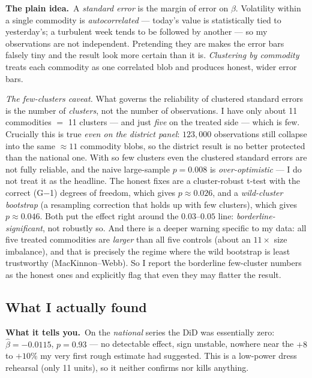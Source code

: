 \documentclass[11pt]{article}
\newcommand{\intuit}{\smallskip\noindent\textbf{The plain idea.}\ }
\newcommand{\tells}{\smallskip\noindent\textbf{What it tells you.}\ }
\begin{document}
\intuit A \emph{standard error} is the margin of error on $\beta$. Volatility within a single
commodity is \emph{autocorrelated} --- today's value is statistically tied to yesterday's; a
turbulent week tends to be followed by another --- so my observations are not independent.
Pretending they are makes the error bars falsely tiny and the result look more certain than it is.
\emph{Clustering by commodity} treats each commodity as one correlated blob and produces honest,
wider error bars.

\smallskip\noindent\emph{The few-clusters caveat.} What governs the reliability of clustered
standard errors is the number of \emph{clusters}, not the number of observations. I have only about
11 commodities $=$ 11 clusters --- and just \emph{five} on the treated side --- which is few.
Crucially this is true \emph{even on the district panel}: $123{,}000$ observations still collapse
into the same $\approx 11$ commodity blobs, so the district result is no better protected than the
national one. With so few clusters even the clustered standard errors are not fully reliable, and
the naive large-sample $p=0.008$ is \emph{over-optimistic} --- I do not treat it as the headline.
The honest fixes are a cluster-robust t-test with the correct (G$-$1) degrees of freedom, which
gives $p\approx0.026$, and a \emph{wild-cluster bootstrap} (a resampling correction that holds up
with few clusters), which gives $p\approx0.046$. Both put the effect right around the
$0.03$--$0.05$ line: \emph{borderline-significant}, not robustly so. And there is a deeper warning
specific to my data: all five treated commodities are \emph{larger} than all five controls (about
an $11\times$ size imbalance), and that is precisely the regime where the wild bootstrap is least
trustworthy (MacKinnon--Webb). So I report the borderline few-cluster numbers as the honest ones
and explicitly flag that even they may flatter the result.

\subsection{What I actually found}

\tells On the \emph{national} series the DiD was essentially zero: $\hat\beta = -0.0115$,
$p = 0.93$ --- no detectable effect, sign unstable, nowhere near the $+8$ to $+10\%$ my very first
rough estimate had suggested. This is a low-power dress rehearsal (only 11 units), so it neither
confirms nor kills anything.
\end{document}
